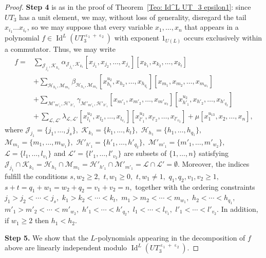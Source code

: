 \documentclass[a4paper,reqno]{amsart}
\theoremstyle{definition}
\numberwithin{equation}{section}
\numberwithin{theorem}{section}
\DeclareMathOperator{\I}{Id}
\DeclareMathOperator{\e}{\varepsilon}
\begin{document}
\begin{proof}
\textbf{Step 4} is as in the proof of Theorem~\ref{Teo: Id^L UT_3 epsilon1}: 
 since $UT_3$ has a unit element, we may, without loss of generality, disregard the tail $x_{i_{1}}\dots x_{i_{r}}$, so we may suppose that every variable $x_1,\ldots,x_n$ that appears in a polynomial $f\in \I^L(UT_3^{\e_1+\e_2})$ with exponent $1_{U(L)}$ occurs exclusively within a commutator. Thus, we may write
\begin{align*}
    f = &\sum_{\mathcal{J}_{j_1}, \mathcal{K}_{k_1}} \alpha_{ \mathcal{J}_{j_1}, \mathcal{K}_{k_1}} [x_{j_1},x_{j_2},\dots,x_{j_s}][x_{k_1},x_{k_2},\dots,x_{k_t}]\\
    &+ \sum_{ \mathcal{H}_{h_1}, \mathcal{M}_{m_1}}  \beta_{\mathcal{H}_{h_1}, \mathcal{M}_{m_1}} [x_{h_1}^{u_{2}},x_{h_2},\dots,x_{h_{q_1}}][x_{m_1},x_{m_2},\dots,x_{m_{w_1}}]\\
    &+ \sum_{ \mathcal{M}'_{m'_1}, \mathcal{H}'_{h'_1}}  \gamma_{ \mathcal{M}'_{m'_1}, \mathcal{H}'_{h'_1}}[x_{m'_1},x_{m'_2},\dots,x_{m'_{w_2}}][x_{h'_1}^{u_{2}},x_{h'_2},\dots,x_{h'_{q_2}}]\\
    &+\, \sum_{\mathcal{L}, \mathcal{L}'}  \lambda_{\mathcal{L}, \mathcal{L}'}[x_{l_1}^{u_{2}},x_{l_2},\dots,x_{l_{v_1}}][x_{l'_1}^{u_{2}},x_{l'_2},\dots,x_{l'_{v_2}}] + \mu [x_{1}^{u_{13}},x_{2},\dots,x_{n}],
\end{align*}
where $\mathcal{J}_{j_1}=\{j_1,\ldots,j_s\},$ $\mathcal{K}_{k_1}=\{k_1,\ldots,k_t\},$ $\mathcal{H}_{h_1}=\{h_1,\ldots,h_{q_1}\},$ $\mathcal{M}_{m_1}=\{m_1,\ldots,m_{w_1}\},$ $\mathcal{H}'_{h'_1}=\{h'_1,\ldots,h'_{q_2}\},$ $\mathcal{M}'_{m'_1}=\{m'_1,\ldots,m'_{w_2}\},$ $\mathcal{L}=\{l_1,\ldots,l_{v_1}\}$ and $\mathcal{L}'=\{l'_1,\ldots,l'_{v_2}\}$
 are subsets of $\{1,\ldots, n\}$ satisfying $\mathcal{J}_{j_1}\cap \mathcal{K}_{k_1}=\mathcal{H}_{h_1}\cap \mathcal{M}_{m_1}=\mathcal{H}'_{h'_1}\cap \mathcal{M}'_{m'_1}=\mathcal{L}\cap \mathcal{L}'=\emptyset$. Moreover, the indices fulfill the conditions
$s,w_2\geq 2,$ $t, w_1\geq 0,$ $t,w_1\neq 1,$ $q_1,q_2,v_1,v_2\geq 1,$ $s+t=q_1+w_1=w_2+q_2=v_1+v_2=n,$ together with the ordering constraints $j_1>j_2<  \cdots < j_s,$ $k_1>k_2<  \cdots < k_t,$ $m_1> m_2< \cdots < m_{w_1},$ $h_2< \cdots <h_{q_1},$ $m'_1> m'_2< \cdots < m'_{w_2},$ $h'_1< \cdots <h'_{q_2},$ $l_1< \cdots < l_{v_1},$ $l'_1< \cdots < l'_{v_2}$. In addition, if $w_1\geq 2$ then $h_1< h_2$.



\textbf{Step 5.} We show that the $L$-polynomials appearing in the decomposition of $f$ above are
linearly independent modulo $\I^L(UT_3^{\e_1+\e_2})$.



\end{proof}
\end{document}
